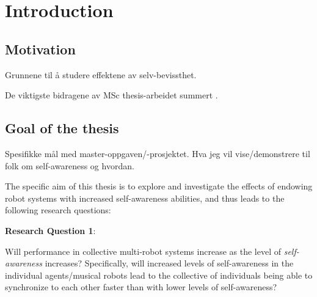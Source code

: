 \chapter{Introduction}
\label{chap:introduction}
	
	
	
	
	
	
	
	
	\section{Motivation}
	
	Grunnene til å studere effektene av selv-bevissthet.
	\nl
	
	De viktigste bidragene av MSc thesis-arbeidet summert .
	
	
	
	
	
	
	
	
	
	\section{Goal of the thesis}
	
	Spesifikke mål  med master-oppgaven/-prosjektet. Hva jeg vil vise/demonstrere til folk  om self-awareness  og hvordan.
	\nl
	
	The specific aim of this thesis is to explore and investigate the effects of endowing robot systems with increased self-awareness abilities, and thus leads to the following research questions:
	
	\textbf{Research Question 1}:
	
	Will performance in collective multi-robot systems increase as the level of \textit{self-awareness} increases? Specifically, will increased levels of self-awareness in the individual agents/musical robots lead to the collective of individuals being able to synchronize to each other faster than with lower levels of self-awareness? \nl
	
